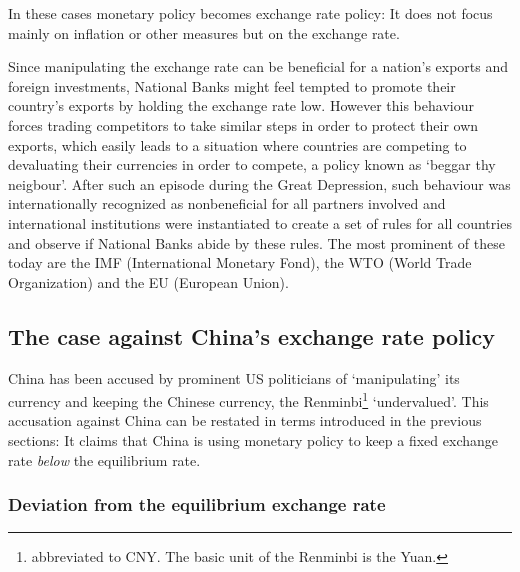 In these cases monetary policy becomes exchange rate policy: It does not focus mainly on inflation or other measures but on the exchange rate.

Since manipulating the 
exchange rate can be beneficial for a nation's exports and 
foreign investments, National Banks might feel tempted to promote their country's exports by holding the exchange rate low. However this behaviour forces trading competitors 
to take similar steps in order to protect their own exports, which 
easily leads to a situation where countries are competing to devaluating 
their currencies in order to compete, a policy known as `beggar thy neigbour'. After such an episode during the Great Depression, such behaviour was internationally recognized as nonbeneficial for all partners involved and international 
institutions were instantiated to create a set of rules for all countries and observe if National Banks abide by these rules. The most prominent of these today are the IMF (International 
Monetary Fond), the WTO (World Trade Organization) and the EU (European 
Union).



\subsection{The case against China's exchange rate policy}

China has been 
accused by prominent US politicians of `manipulating' its currency and 
keeping the Chinese currency, the Renminbi\footnote{abbreviated to CNY. 
The basic unit of the Renminbi is the Yuan.} `undervalued'. This accusation against China can be restated in terms introduced in the previous sections: It claims that China is using monetary policy to keep a 
fixed exchange rate \emph{below} the equilibrium rate. 

\subsubsection{Deviation from the equilibrium exchange rate}


